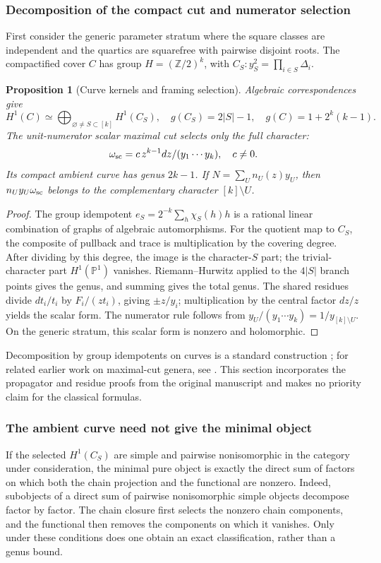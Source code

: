 \documentclass[11pt,a4paper,oneside]{article}
\theoremstyle{plain}
\newtheorem{proposition}[theorem]{Proposition}
\theoremstyle{definition}
\theoremstyle{remark}
\numberwithin{equation}{section}
\begin{document}
\subsubsection{Decomposition of the compact cut and numerator selection}
First consider the generic parameter stratum where the square classes are independent and the quartics are squarefree with pairwise disjoint roots.
The compactified cover $C$ has group $H=(\mathbb Z/2)^k$, with
$C_S:y_S^2=\prod_{i\in S}\Delta_i$.

\begin{proposition}[Curve kernels and framing selection]\label{unified:prop:star}
Algebraic correspondences give
\[
 H^1(C)\simeq\bigoplus_{\varnothing\ne S\subset[k]}H^1(C_S),
 \quad g(C_S)=2|S|-1,\quad g(C)=1+2^k(k-1).
\]
The unit-numerator scalar maximal cut selects only the full character:
\[
 \omega_{\rm sc}=c\,z^{k-1}dz/(y_1\cdots y_k),\quad c\ne0.
\]
Its compact ambient curve has genus $2k-1$. If $N=\sum_U n_U(z)y_U$,
then $n_Uy_U\omega_{\rm sc}$ belongs to the complementary character $[k]\setminus U$.
\end{proposition}
\begin{proof}
The group idempotent $e_S=2^{-k}\sum_h\chi_S(h)h$ is a rational linear combination of graphs of algebraic automorphisms.
For the quotient map to $C_S$, the composite of pullback and trace is multiplication by the covering degree. After dividing by this degree,
the image is the character-$S$ part; the trivial-character part $H^1(\mathbb P^1)$ vanishes.
Riemann--Hurwitz applied to the $4|S|$ branch points gives the genus, and summing gives the total genus.
The shared residues divide $dt_i/t_i$ by $F_i/(zt_i)$, giving $\pm z/y_i$;
multiplication by the central factor $dz/z$ yields the scalar form.
The numerator rule follows from $y_U/(y_1\cdots y_k)=1/y_{[k]\setminus U}$.
On the generic stratum, this scalar form is nonzero and holomorphic.
\end{proof}
Decomposition by group idempotents on curves is a standard construction \cite{KR};
for related earlier work on maximal-cut genera, see \cite{HHMZ}.
This section incorporates the propagator and residue proofs from the original manuscript and makes no priority claim for the classical formulas.

\subsubsection{The ambient curve need not give the minimal object}
If the selected $H^1(C_S)$ are simple and pairwise nonisomorphic in the category under consideration,
the minimal pure object is exactly the direct sum of factors on which both the chain projection and the functional are nonzero.
Indeed, subobjects of a direct sum of pairwise nonisomorphic simple objects decompose factor by factor. The chain closure first selects the nonzero chain components,
and the functional then removes the components on which it vanishes. Only under these conditions does one obtain an exact classification, rather than a genus bound.
\end{document}
